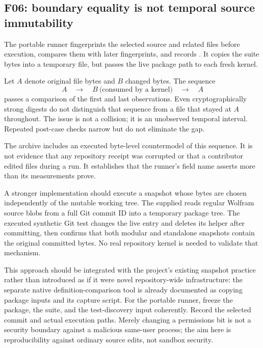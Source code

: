\documentclass[11pt,letterpaper]{article}
\newcommand{\code}[1]{\texttt{\detokenize{#1}}}
\begin{document}
\subsection{F06: boundary equality is not temporal source immutability}

The portable runner fingerprints the selected source and related files before execution, compares them with later fingerprints, and records \code{SourcesUnchangedDuringRun}. It copies the suite bytes into a temporary file, but passes the live package path to each fresh kernel.\cite{portable-runner}

Let $A$ denote original file bytes and $B$ changed bytes. The sequence
\[
 A\quad\longrightarrow\quad B\ \text{(consumed by a kernel)}
 \quad\longrightarrow\quad A
\]
passes a comparison of the first and last observations. Even cryptographically strong digests do not distinguish that sequence from a file that stayed at $A$ throughout. The issue is not a collision; it is an unobserved temporal interval. Repeated post-case checks narrow but do not eliminate the gap.

The archive includes an executed byte-level countermodel of this sequence. It is not evidence that any repository receipt was corrupted or that a contributor edited files during a run. It establishes that the runner's field name asserts more than its measurements prove.

A stronger implementation should execute a snapshot whose bytes are chosen independently of the mutable working tree. The supplied  reads regular Wolfram source blobs from a full Git commit ID into a temporary package tree. The executed synthetic Git test changes the live entry and deletes its helper after committing, then confirms that both modular and standalone snapshots contain the original committed bytes. No real repository kernel is needed to validate that mechanism.

This approach should be integrated with the project's existing snapshot practice rather than introduced as if it were novel repository-wide infrastructure: the separate native definition-comparison tool is already documented as copying package inputs and its capture script.\cite{mathics-doc} For the portable runner, freeze the package, the suite, and the test-discovery input coherently. Record the selected commit and actual execution paths. Merely changing a permissions bit is not a security boundary against a malicious same-user process; the aim here is reproducibility against ordinary source edits, not sandbox security.
\end{document}
